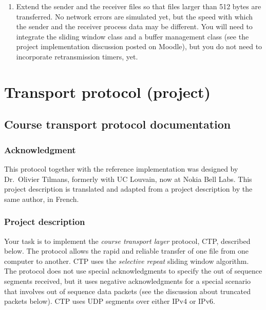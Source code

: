\documentclass[12pt]{book}
\begin{document}
\begin{enumerate}[label=\arabic*.]
\begin{enumerate}[label=\arabic*.]
  \item \label{pl6.trei} Extend the sender and the receiver files so that files larger than 512 bytes are transferred. No network errors are simulated yet, but the speed with which the sender and the receiver process data may be different. You will need to integrate the sliding window class and a buffer management class (see the project implementation discussion posted on Moodle), but you do not need to incorporate retransmission timers, yet. 
\end{enumerate}


\part{Transport protocol (project)}\label{protocol.part}

\newcommand{\must}{\textbf{MUST}}
\newcommand{\should}{\textbf{SHOULD}}

\newcommand{\pdata}{\texttt{PTYPE\_DATA}}
\newcommand{\pack}{\texttt{PTYPE\_ACK}}
\newcommand{\pnack}{\texttt{PTYPE\_NACK}}

\newcommand{\sender}{\texttt{sender}}
\newcommand{\receiver}{\texttt{receiver}}


\chapter{Course transport protocol documentation}\label{proto-doc.se}

\section{Acknowledgment}

This protocol together with the reference implementation was designed by Dr.~Olivier Tilmans, formerly with UC Louvain, now at Nokia Bell Labs. This project description is translated and adapted from a project description by the same author, in French.

\section{Project description}

Your task is to implement the \emph{course transport layer} protocol, CTP, described below. The protocol allows the rapid and reliable transfer of one file from one computer to another. CTP uses the \emph{selective repeat} sliding window algorithm. The protocol does not use special acknowledgments to specify the out of sequence segments received, but it uses negative acknowledgments for a special scenario that involves out of sequence data packets (see the discussion about truncated packets below). CTP uses UDP segments over either IPv4 or IPv6.


\end{enumerate}
\end{document}
